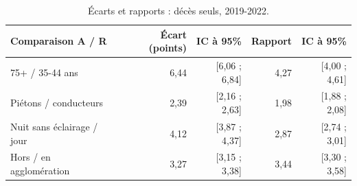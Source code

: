 \begin{table}[htbp]
\centering\small
\renewcommand{\arraystretch}{1.18}
\caption{Écarts et rapports : décès seuls, 2019-2022.}\label{tab:deces_seul}
\begin{tabular*}{\textwidth}{@{\extracolsep{\fill}}lrrrr@{}}
\toprule
Comparaison A / R & Écart (points) & IC à 95\% & Rapport & IC à 95\% \\
\midrule
75+ / 35-44 ans & 6,44 & [6,06 ; 6,84] & 4,27 & [4,00 ; 4,61] \\
Piétons / conducteurs & 2,39 & [2,16 ; 2,63] & 1,98 & [1,88 ; 2,08] \\
Nuit sans éclairage / jour & 4,12 & [3,87 ; 4,37] & 2,87 & [2,74 ; 3,01] \\
Hors / en agglomération & 3,27 & [3,15 ; 3,38] & 3,44 & [3,30 ; 3,58] \\
\bottomrule
\end{tabular*}
\end{table}
